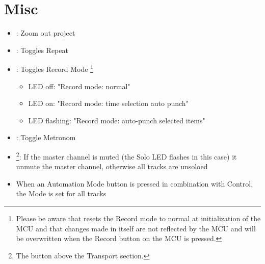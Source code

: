 \section{Misc}\label{misc}
\begin{itemize}
\item \shift \zoom: Zoom out project

\item \cycle: Toggles Repeat

\item \drop: Toggles Record Mode \footnote{Please be aware that \mcu
    resets the Record mode to normal at initialization of the MCU
    and that changes made in \reaper itself are not reflected by the
    MCU and will be overwritten when the Record button on the MCU is
    pressed.} \bemod
\begin{itemize}
	\item LED off:   "Record mode: normal"
	\item LED on:    "Record mode: time selection auto punch"
	\item LED flashing: "Record mode: auto-punch selected items"
\end{itemize}
\item \click: Toggle Metronom
\item \solo\footnote{The \solo button above the Transport section.}:
  If the master channel is muted (the Solo LED flashes in this case)
  it unmute the master channel, otherwise all tracks are unsoloed
\item When an Automation Mode button is pressed in combination with
  Control, the Mode is set for all tracks
\end{itemize}



